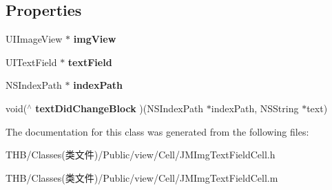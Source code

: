 \subsection*{Properties}
\begin{DoxyCompactItemize}
\item 
\mbox{\label{interface_j_m_img_text_field_cell_a90eae553491e76025db19d77378b5638}} 
U\+I\+Image\+View $\ast$ {\bfseries img\+View}
\item 
\mbox{\label{interface_j_m_img_text_field_cell_a26a4abf13b5b92ad2041ea81caf60537}} 
U\+I\+Text\+Field $\ast$ {\bfseries text\+Field}
\item 
\mbox{\label{interface_j_m_img_text_field_cell_af02877cb7deccd4e53c1dfb9f7617e65}} 
N\+S\+Index\+Path $\ast$ {\bfseries index\+Path}
\item 
\mbox{\label{interface_j_m_img_text_field_cell_a731b0ad8637752d6c68491a1a6f1b3ad}} 
void($^\wedge$ {\bfseries text\+Did\+Change\+Block} )(N\+S\+Index\+Path $\ast$index\+Path, N\+S\+String $\ast$text)
\end{DoxyCompactItemize}


The documentation for this class was generated from the following files\+:\begin{DoxyCompactItemize}
\item 
T\+H\+B/\+Classes(类文件)/\+Public/view/\+Cell/J\+M\+Img\+Text\+Field\+Cell.\+h\item 
T\+H\+B/\+Classes(类文件)/\+Public/view/\+Cell/J\+M\+Img\+Text\+Field\+Cell.\+m\end{DoxyCompactItemize}
